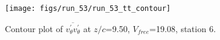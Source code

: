\begin{figure}[H]
\centering
\texttt{[image: figs/run\_53/run\_53\_tt\_contour]}
\caption{Contour plot of $\overline{v_{\theta}^{\prime} v_{\theta}^{\prime}}$ at $z/c$=9.50, $V_{free}$=19.08, station 6.}
\label{fig:run_53_tt_contour}
\end{figure}


